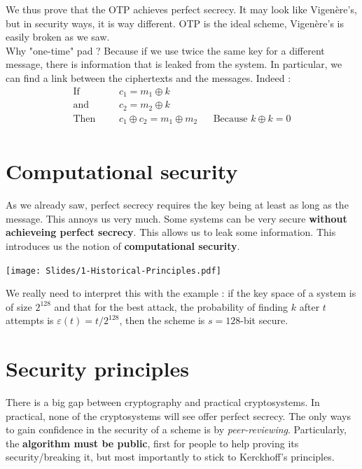 \documentclass[../Cryptography.tex]{subfiles}
\begin{document}
We thus prove that the OTP achieves perfect secrecy. It may look like Vigenère's, but in security ways, it is way different. OTP is the ideal scheme, Vigenère's is easily broken as we saw. \\

Why "one-time" pad ? Because if we use twice the same key for a different message, there is information that is leaked from the system. In particular, we can find a link between the ciphertexts and the messages. Indeed :
\begin{align*}
    \text{If} &&& c_1 = m_1 \oplus k \\
    \text{and} &&& c_2 = m_2 \oplus k \\
    \text{Then} &&& c_1 \oplus c_2 = m_1\oplus m_2 && \text{Because $k\oplus k = 0$} \\
\end{align*}

\section{Computational security}
As we already saw, perfect secrecy requires the key being at least as long as the message. This annoys us very much. Some systems can be very secure \textbf{without achieveing perfect secrecy}. This allows us to leak some information. This introduces us the notion of \textbf{computational security}. \\


\begin{center}
    \texttt{[image: Slides/1-Historical-Principles.pdf]}
\end{center}

We really need to interpret this with the example : if the key space of a system is of size $2^{128}$ and that for the best attack, the probability of finding $k$ after $t$ attempts is $\varepsilon(t) = t/2^{128}$, then the scheme is $s=128$-bit secure. 

\section{Security principles}
There is a big gap between cryptography and practical cryptosystems. In practical, none of the cryptosystems will see offer perfect secrecy. The only ways to gain confidence in the security of a scheme is by \textit{peer-reviewing}. Particularly, the \textbf{algorithm must be public}, first for people to help proving its security/breaking it, but most importantly to stick to Kerckhoff's principles.
\end{document}
